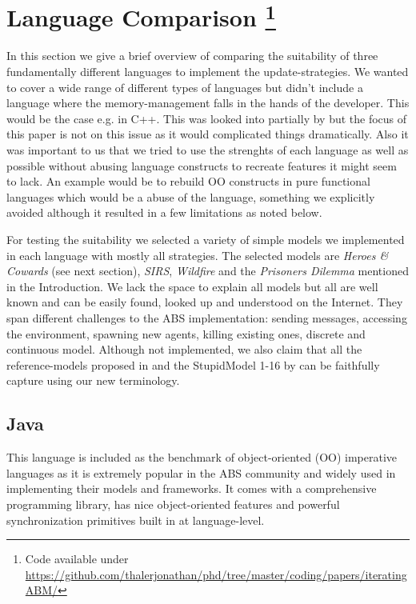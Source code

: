 \section[Language Comparison]{Language Comparison \footnote{Code available under\\ \url{https://github.com/thalerjonathan/phd/tree/master/coding/papers/iteratingABM/}}}
In this section we give a brief overview of comparing the suitability of three fundamentally different languages to implement the update-strategies. We wanted to cover a wide range of different types of languages but didn't include a language where the memory-management falls in the hands of the developer. This would be the case e.g. in C++. This was looked into partially by \cite{dawson_opening_2014} but the focus of this paper is not on this issue as it would complicated things dramatically. Also it was important to us that we tried to use the strenghts of each language as well as possible without abusing language constructs to recreate features it might seem to lack. An example would be to rebuild OO constructs in pure functional languages which would be a abuse of the language, something we explicitly avoided although it resulted in a few limitations as noted below.

For testing the suitability we selected a variety of simple models we implemented in each language with mostly all strategies. The selected models are \textit{Heroes \& Cowards} (see next section), \textit{SIRS}, \textit{Wildfire} and the \textit{Prisoners Dilemma} mentioned in the Introduction. We lack the space to explain all models but all are well known and can be easily found, looked up and understood on the Internet. They span different challenges to the ABS implementation: sending messages, accessing the environment, spawning new agents, killing existing ones, discrete and continuous model. Although not implemented, we also claim that all the reference-models proposed in \cite{isaac_abm_2011} and the StupidModel 1-16 by \cite{railsback_stupidmodel_2005} can be faithfully capture using our new terminology.


\subsection{Java}
This language is included as the benchmark of object-oriented (OO) imperative languages as it is extremely popular in the ABS community and widely used in implementing their models and frameworks. It comes with a comprehensive programming library, has nice object-oriented features and powerful synchronization primitives built in at language-level.

